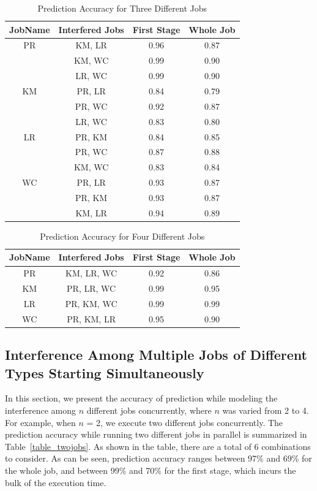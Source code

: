 \begin{table}[!htb]
\renewcommand{\arraystretch}{1.3}
\caption{Prediction Accuracy for Three Different Jobs}
\label{table_threejobs}
\centering
\begin{tabular}{c|c|c|c}
\hline
\bfseries JobName & \bfseries Interfered Jobs & \bfseries First Stage & \bfseries Whole Job\\
\hline\hline
PR & KM, LR & 0.96 & 0.87\\
& KM, WC & 0.99 & 0.90\\
& LR, WC & 0.99 & 0.90\\
\hline
KM & PR, LR & 0.84 & 0.79\\
& PR, WC & 0.92 & 0.87\\
& LR, WC & 0.83 & 0.80\\
\hline
LR & PR, KM & 0.84 & 0.85\\
& PR, WC & 0.87 & 0.88\\
& KM, WC & 0.83 & 0.84\\
\hline
WC & PR, LR & 0.93 & 0.87\\
& PR, KM & 0.93 & 0.87\\
& KM, LR & 0.94 & 0.89\\
\hline
\end{tabular}
\end{table}


\begin{table}[!htb]
\renewcommand{\arraystretch}{1.3}
\caption{Prediction Accuracy for Four Different Jobs}
\label{table_fourjobs}
\centering
\begin{tabular}{c|c|c|c}
\hline
\bfseries JobName & \bfseries Interfered Jobs & \bfseries First Stage & \bfseries Whole Job\\
\hline\hline
PR & KM, LR, WC & 0.92 & 0.86\\
\hline
KM & PR, LR, WC & 0.99 & 0.95\\
\hline
LR & PR, KM, WC & 0.99 & 0.99 \\
\hline
WC & PR, KM, LR & 0.95 & 0.90\\
\hline
\end{tabular}
\end{table}


\subsection{Interference Among Multiple Jobs of Different Types Starting Simultaneously}
\noindent
In this section, we present the accuracy of prediction while modeling the interference among $n$ different jobs concurrently, where $n$ was varied from 2 to 4. For example, when $n$ = 2, we execute two different jobs concurrently. The prediction accuracy while running two different jobs in parallel is summarized in Table~\ref{table_twojobs}. As shown in the table, there are a total of 6 combinations to consider. As can be seen, prediction accuracy ranges between 97\% and 69\% for the whole job, and between 99\% and 70\% for the first stage, which incurs the bulk of the execution time. 

